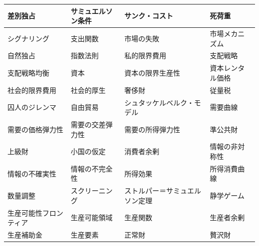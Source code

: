 \documentclass[xelatex,a4paper,base=11pt,ja=standard,jafont=noto]{bxjsreport}
\begin{document}
\begin{table}[H]
\begin{tabular}{|>{\raggedright\arraybackslash}p{3.5cm}|>{\raggedright\arraybackslash}p{3.5cm}|>{\raggedright\arraybackslash}p{3.5cm}|>{\raggedright\arraybackslash}p{3.5cm}|}
\hline
差別独占 & サミュエルソン条件 & サンク・コスト & 死荷重 \\
\hline
シグナリング & 支出関数 & 市場の失敗 & 市場メカニズム \\
\hline
自然独占 & 指数法則 & 私的限界費用 & 支配戦略 \\
\hline
支配戦略均衡 & 資本 & 資本の限界生産性 & 資本レンタル価格 \\
\hline
社会的限界費用 & 社会的厚生 & 奢侈財 & 従量税 \\
\hline
囚人のジレンマ & 自由貿易 & シュタッケルベルク・モデル & 需要曲線 \\
\hline
需要の価格弾力性 & 需要の交差弾力性 & 需要の所得弾力性 & 準公共財 \\
\hline
上級財 & 小国の仮定 & 消費者余剰 & 情報の非対称性 \\
\hline
情報の不確実性 & 情報の不完全性 & 所得効果 & 所得消費曲線 \\
\hline
数量調整 & スクリーニング & ストルパー＝サミュエルソン定理 & 静学ゲーム \\
\hline
生産可能性フロンティア & 生産可能領域 & 生産関数 & 生産者余剰 \\
\hline
生産補助金 & 生産要素 & 正常財 & 贅沢財 \\
\hline
\end{tabular}
\end{table}
\end{document}
